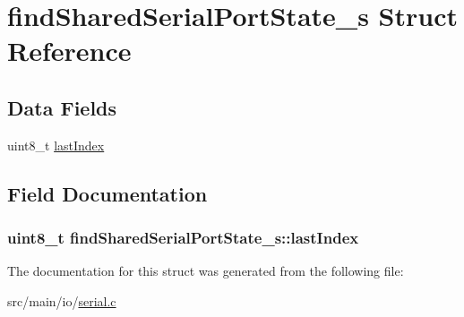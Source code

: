 \hypertarget{structfindSharedSerialPortState__s}{\section{find\+Shared\+Serial\+Port\+State\+\_\+s Struct Reference}
\label{structfindSharedSerialPortState__s}
}
\subsection*{Data Fields}
\begin{DoxyCompactItemize}
\item 
uint8\+\_\+t \hyperlink{structfindSharedSerialPortState__s_a698f3866788475655d6e31a852b38c14}{last\+Index}
\end{DoxyCompactItemize}


\subsection{Field Documentation}
\hypertarget{structfindSharedSerialPortState__s_a698f3866788475655d6e31a852b38c14}{
\subsubsection[{last\+Index}]{\setlength{\rightskip}{0pt plus 5cm}uint8\+\_\+t find\+Shared\+Serial\+Port\+State\+\_\+s\+::last\+Index}}\label{structfindSharedSerialPortState__s_a698f3866788475655d6e31a852b38c14}


The documentation for this struct was generated from the following file\+:\begin{DoxyCompactItemize}
\item 
src/main/io/\hyperlink{io_2serial_8c}{serial.\+c}\end{DoxyCompactItemize}
